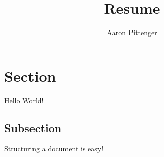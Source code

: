 \documentclass{article}
\title{Resume}
\author{Aaron Pittenger}
\begin{document}
\section*{Section}

Hello World!

\subsection*{Subsection}

Structuring a document is easy!
\end{document}
